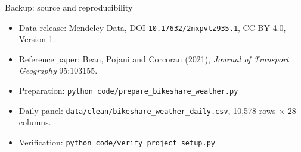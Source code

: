 \documentclass[aspectratio=169,11pt]{beamer}
\begin{document}
\begin{frame}{Backup: source and reproducibility}
  \footnotesize
  \begin{itemize}
    \setlength{\itemsep}{0.14cm}
    \item Data release: Mendeley Data, DOI \texttt{10.17632/2nxpvtz935.1},
      CC BY 4.0, Version 1.
    \item Reference paper: Bean, Pojani and Corcoran (2021),
      \emph{Journal of Transport Geography} 95:103155.
    \item Preparation: \texttt{python code/prepare\_bikeshare\_weather.py}
    \item Daily panel: \texttt{data/clean/bikeshare\_weather\_daily.csv},
      10{,}578 rows $\times$ 28 columns.
    \item Verification: \texttt{python code/verify\_project\_setup.py}
  \end{itemize}
\end{frame}
\end{document}
